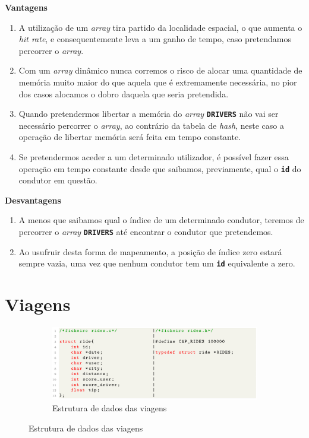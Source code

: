 \documentclass[12pt,a4paper]{report}
\begin{document}
\normalsize\textbf{Vantagens}
    \begin{enumerate}
        \item A utilização de um \textit{array} tira partido da localidade espacial, o que aumenta o \textit{hit rate}, e consequentemente leva a um ganho de tempo, caso pretendamos percorrer o \textit{array}.
        
        \item Com um \textit{array} dinâmico nunca corremos o risco de alocar uma quantidade de memória muito maior do que aquela que é extremamente necessária, no pior dos casos alocamos o dobro daquela que seria pretendida.
        
        \item Quando pretendermos libertar a memória do \textit{array} \textbf{\small\texttt{DRIVERS}} não vai ser necessário percorrer o \textit{array}, ao contrário da tabela de \textit{hash}, neste caso a operação de libertar memória será feita em tempo constante.
        
        \item Se pretendermos aceder a um determinado utilizador, é possível fazer essa operação em tempo constante desde que saibamos, previamente, qual o \textbf{\small\texttt{id}} do condutor em questão.
    \end{enumerate}

\normalsize\textbf{Desvantagens}
    \begin{enumerate}
        \item A menos que saibamos qual o índice de um determinado condutor, teremos de percorrer o \textit{array} \textbf{\small\texttt{DRIVERS}} até encontrar o condutor que pretendemos.

        \item Ao usufruir desta forma de mapeamento, a posição de índice zero estará sempre vazia, uma vez que nenhum condutor tem um \textbf{\small\texttt{id}} equivalente a zero.
    \end{enumerate}

\pagebreak
\section{Viagens}

\begin{figure}[hbt!]
    \centering
    \begin{subfigure}{\textwidth}
        \centering
        \includegraphics[width=1\linewidth]{images/rides.png}
        \caption*{Estrutura de dados das viagens}
        \label{fig:rides}
    \end{subfigure}
\end{figure}
\end{document}
